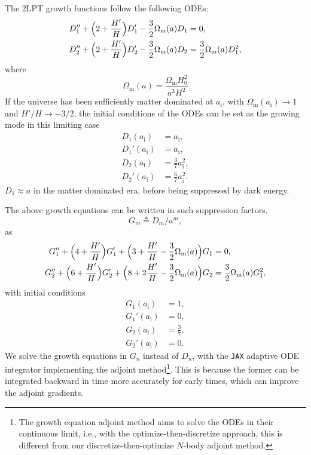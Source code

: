 \documentclass[modern, trackchanges, dvipsnames]{aastex631}
\newcommand{\Omegam}{\Omega_\mathrm{m}}
\newcommand{\ic}{\mathrm{i}}
\begin{document}
The 2LPT growth functions follow the following ODEs:
\begin{align}
  D_1'' + \Bigl( 2 + \frac{H'}H \Bigr) D_1' - \frac32 \Omegam(a) D_1
  &= 0, \nonumber\\
  D_2'' + \Bigl( 2 + \frac{H'}H \Bigr) D_2' - \frac32 \Omegam(a) D_2
  &= \frac32 \Omegam(a) D_1^2,
\end{align}
where
\begin{equation}
    \Omegam(a) = \frac{\Omegam H_0^2}{a^3 H^2}
\end{equation}
If the universe has been sufficiently matter dominated at $a_\ic$, with
$\Omegam(a_\ic) \to 1$ and $H'/H \to -3/2$, the initial conditions of
the ODEs can be set as the growing mode in this limiting case
\begin{align}
    D_1(a_\ic) &= a_\ic, \nonumber\\
    D_1'(a_\ic) &= a_\ic, \nonumber\\
    D_2(a_\ic) &= \frac37 a_\ic^2, \nonumber\\
    D_2'(a_\ic) &= \frac67 a_\ic^2.
\end{align}
$D_1 \approx a$ in the matter dominated era, before being suppressed by
dark energy.

The above growth equations can be written in such suppression factors,
\begin{equation}
  G_m \triangleq D_m / a^m,
\end{equation}
as
\begin{align}
  G_1'' + \Bigl( 4 + \frac{H'}H \Bigr) G_1'
  + \Bigl( 3 + \frac{H'}H - \frac32 \Omegam(a) \Bigr) G_1
  &= 0, \nonumber\\
  G_2'' + \Bigl( 6 + \frac{H'}H \Bigr) G_2'
  + \Bigl( 8 + 2\frac{H'}H - \frac32 \Omegam(a) \Bigr) G_2
  &= \frac32 \Omegam(a) G_1^2,
\end{align}
with initial conditions
\begin{align}
    G_1(a_\ic) &= 1, \nonumber\\
    G_1'(a_\ic) &= 0, \nonumber\\
    G_2(a_\ic) &= \frac37, \nonumber\\
    G_2'(a_\ic) &= 0.
\end{align}
We solve the growth equations in $G_n$ instead of $D_n$, with the
\texttt{JAX} adaptive ODE integrator implementing the adjoint
method\footnote{The growth equation adjoint method aims to solve the
ODEs in their continuous limit, i.e., with the optimize-then-discretize
approach, this is different from our discretize-then-optimize $N$-body
adjoint method.}.
This is because the former can be integrated backward in time more
accurately for early times, which can improve the adjoint gradients.
\end{document}
